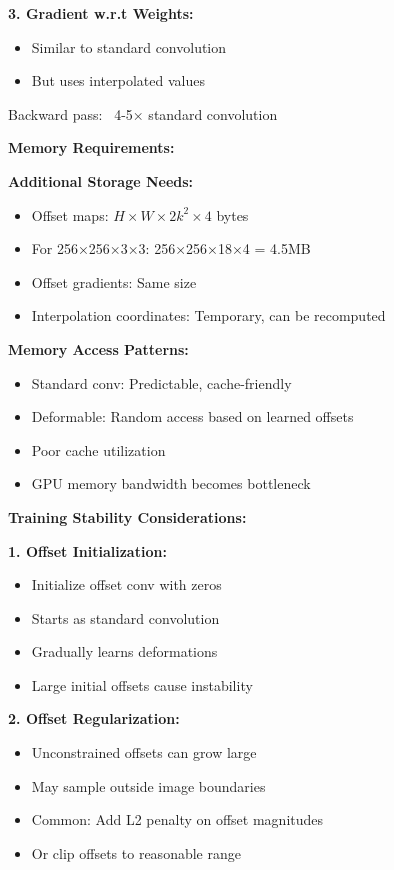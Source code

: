 \documentclass[12pt]{article}
\newcommand{\explanation}[1]{{\color{explanationcolor}#1}}
\begin{document}
\begin{enumerate}[(a)]
{{    \textbf{3. Gradient w.r.t Weights:}
    \begin{itemize}
        \item Similar to standard convolution
        \item But uses interpolated values
    \end{itemize}
    
    Backward pass: ~4-5× standard convolution
    }
    
    \textbf{Memory Requirements:}
    
    \explanation{
    \textbf{Additional Storage Needs:}
    \begin{itemize}
        \item Offset maps: $H \times W \times 2k^2 \times 4$ bytes
        \item For 256×256×3×3: 256×256×18×4 = 4.5MB
        \item Offset gradients: Same size
        \item Interpolation coordinates: Temporary, can be recomputed
    \end{itemize}
    
    \textbf{Memory Access Patterns:}
    \begin{itemize}
        \item Standard conv: Predictable, cache-friendly
        \item Deformable: Random access based on learned offsets
        \item Poor cache utilization
        \item GPU memory bandwidth becomes bottleneck
    \end{itemize}
    }
    
    \textbf{Training Stability Considerations:}
    
    \explanation{
    \textbf{1. Offset Initialization:}
    \begin{itemize}
        \item Initialize offset conv with zeros
        \item Starts as standard convolution
        \item Gradually learns deformations
        \item Large initial offsets cause instability
    \end{itemize}
    
    \textbf{2. Offset Regularization:}
    \begin{itemize}
        \item Unconstrained offsets can grow large
        \item May sample outside image boundaries
        \item Common: Add L2 penalty on offset magnitudes
        \item Or clip offsets to reasonable range
    \end{itemize}
    
}}
\end{enumerate}
\end{document}
